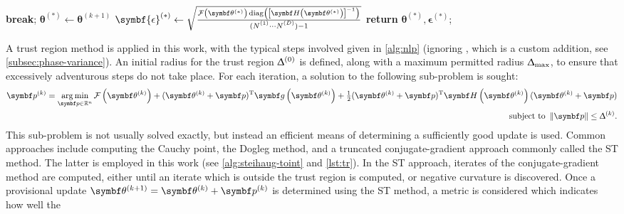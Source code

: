 \begin{algorithm}
\begin{algorithmic}[1]
                \EndIf\label{state:neg-amp-end}
                    \State \textbf{break};
                \EndIf
            \EndFor
            \State $\symbf{\theta}^{(*)} \gets \symbf{\theta}^{(k+1)}$
            \State $\symbf{\epsilon}^{(*)} \gets
                \sqrt{
                    \frac
                    {
                        \Fthstar \diag \left(
                            \left[\bdHthstar\right]^{-1}
                        \right)
                    }
                    {(\None \cdots \ND) - 1}
                }$
            \State \textbf{return} $\symbf{\theta}^{(*)}, \symbf{\epsilon}^{(*)}$;
        \EndProcedure
    \end{algorithmic}
\end{algorithm}
A trust region method is applied in this work,
with the typical steps involved given in
\cref{alg:nlp} (ignoring , which is a custom addition,
see \cref{subsec:phase-variance}). An initial radius for the trust region
$\Updelta^{(0)}$ is defined, along with a maximum permitted radius
$\Updelta_{\text{max}}$, to ensure that excessively adventurous steps do not take place.
For each iteration, a solution to the following sub-problem is sought:
\begin{equation}
    \begin{split}
        \bpk = \argmin_{\bp \in \mathbb{R}^{n}}
            \Fthk +
            (\bthk + \bp)\T \bdgthk +
            \tfrac{1}{2} (\bthk + \bp)\T \bdHthk (\bthk + \bp) \\
        \text{subject to } \left \lVert \bp \right \rVert \leq \trustradius{k}.
    \end{split}
\end{equation}
This sub-problem is not usually solved exactly, but instead an efficient
means of determining a sufficiently good update is used.
Common approaches include computing the Cauchy point, the Dogleg
method, and a truncated conjugate-gradient
approach commonly called the \ac{ST} method\cite[Chapter 7]{Nocedal2006}.
The latter is employed in this work (see \cref{alg:steihaug-toint} and
\cref{lst:tr}). In the \ac{ST} approach, iterates of the conjugate-gradient
method\cite[Chapter 5]{Nocedal2006} are computed, either until an iterate which
is outside the trust region is computed, or negative curvature is discovered.
Once a provisional update $\bthkplusone = \bthk + \bpk$ is determined using the
\ac{ST} method, a metric is considered which indicates how well the
